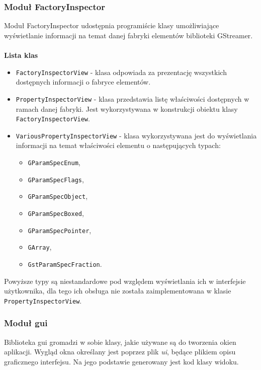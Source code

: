 \documentclass[12pt]{article}
\begin{document}
\subsubsection{Moduł FactoryInspector}
Moduł FactoryInspector udostępnia programiście klasy umożliwiające wyświetlanie informacji na temat danej fabryki elementów biblioteki GStreamer. 
\paragraph{}
\textbf{Lista klas}
\vspace{-2mm}
\begin{itemize}
  \setlength{\itemsep}{0em}
\item \texttt{FactoryInspectorView} - klasa odpowiada za prezentację wszystkich dostępnych informacji o fabryce elementów. 
\item \texttt{PropertyInspectorView} - klasa przedstawia listę właściwości dostępnych w ramach danej fabryki. Jest wykorzystywana w konstrukcji obiektu klasy \\\texttt{FactoryInspectorView}.
\item \texttt{VariousPropertyInspectorView} - klasa wykorzystywana jest do wyświetlania informacji na temat właściwości elementu o następujących typach:
  \begin{itemize}
    \setlength{\itemsep}{0em}
  \item \texttt{GParamSpecEnum},
  \item \texttt{GParamSpecFlags},
  \item \texttt{GParamSpecObject},
  \item \texttt{GParamSpecBoxed},
  \item \texttt{GParamSpecPointer},
  \item \texttt{GArray},
  \item \texttt{GstParamSpecFraction}.
  \end{itemize}
\end{itemize}
Powyższe typy są niestandardowe pod względem wyświetlania ich w interfejsie użytkownika, dla tego ich obsługa nie została zaimplementowana w klasie \\\texttt{PropertyInspectorView}.
\subsubsection{Moduł gui}
Biblioteka gui gromadzi w sobie klasy, jakie używane są do tworzenia okien aplikacji. Wygląd okna określany jest poprzez plik \textit{ui}, będące plikiem opisu graficznego interfejsu. Na jego podstawie generowany jest kod klasy widoku. 
\end{document}
